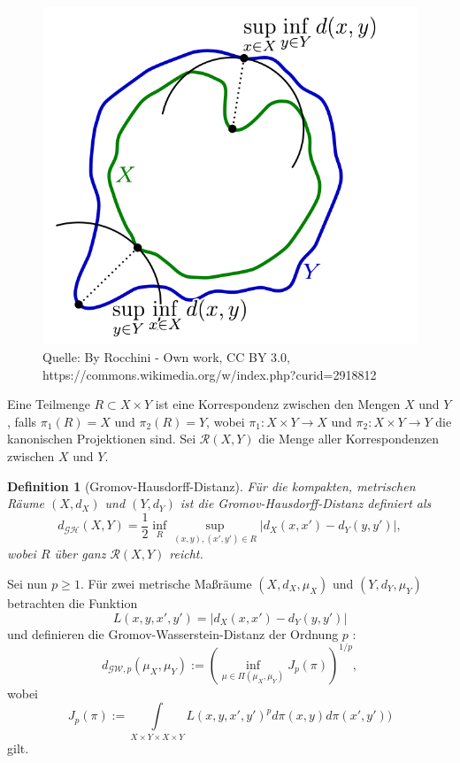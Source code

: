 \documentclass[11pt,a4paper]{article}
\newcommand{\source}[1]{\caption*{\small \hfill Quelle: {#1}} }
\def\emph#1{\textit{#1}}
\newtheorem{definition}[theorem]{Definition}
\numberwithin{equation}{section}
\begin{document}
	\begin{figure}[ht]
		\centering
		\includegraphics[width=0.3\textheight]{Hausdorff_distance.png}
		\caption{Visualisierung der Hausdorff-Distanz zwischen den Mengen $X$ und $Y$ in $\mathbb{R}^2$.}
		\source{By Rocchini - Own work, CC BY 3.0, https://commons.wikimedia.org/w/index.php?curid=2918812}
		\label{im:hausdorff_example}
	\end{figure}
	
	
	Eine Teilmenge $R \subset X \times Y$ ist eine Korrespondenz zwischen den Mengen $X$ und $Y$, falls $\pi_1(R) = X$ und $\pi_2(R) = Y$, wobei $\pi_1: X \times Y \to X$ und $\pi_2: X \times Y \to Y$ die kanonischen Projektionen sind. Sei $\mathcal{R}(X,Y)$ die Menge aller Korrespondenzen zwischen $X$ und $Y$.
	
	\begin{definition}[Gromov-Hausdorff-Distanz]
		Für die kompakten, metrischen Räume $(X,d_X)$ und $(Y,d_Y)$ ist die \emph{Gromov-Hausdorff-Distanz} definiert als
		\begin{equation}
		d_{\mathcal{G}\mathcal{H}}(X,Y) = \frac{1}{2}\inf_{R} \sup_{(x,y),(x',y') \in R}{|d_X(x,x')- d_Y(y,y')|}, \label{eq:gh}
		\end{equation}
		wobei $R$ über ganz $\mathcal{R}(X,Y)$ reicht.
	\end{definition}
	
	Sei nun $p\geq 1$. Für zwei metrische Maßräume $(X,d_X,\mu_X)$ und $(Y,d_Y,\mu_Y)$ betrachten die Funktion 
	\begin{equation}
	L(x,y,x',y') = |d_X(x,x') - d_Y(y,y')|
	\end{equation}
	und definieren die Gromov-Wasserstein-Distanz der Ordnung $p$ \cite{memoli2011gromov}:
	\begin{equation}
	d_{\mathcal{GW},p}(\mu_X,\mu_Y):=\left(\inf_{\mu \in \Pi(\mu_X, \mu_Y)} {J_p(\pi)}\right)^{1/p},
	\end{equation}
	wobei
	\begin{equation}
	J_p(\pi) := \int\limits_{X\times Y \times  X\times Y}{L(x,y,x',y')^pd\pi(x,y)d\pi(x',y'))}
	\end{equation}
	gilt.
	
\end{document}
